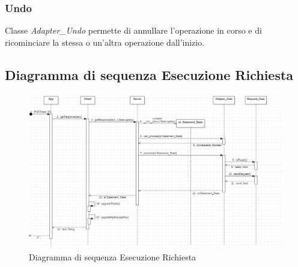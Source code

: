 \subsubsection{Undo} Classe \textit{Adapter\_Undo} permette di annullare l'operazione in corso e di ricominciare la stessa o un'altra operazione dall'inizio.
\subsection{Diagramma di sequenza Esecuzione Richiesta}
\newpage

\begin{landscape}
	\begin{figure}[H]
	\centering\includegraphics[width=\linewidth]{images/diagramma_sequenza_server.jpg}
    \caption{Diagramma di sequenza Esecuzione Richiesta }
	\end{figure}
\end{landscape}
